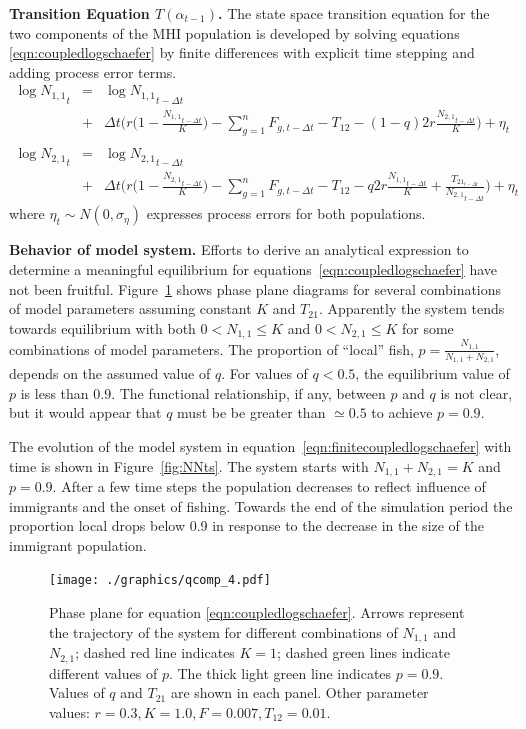 \documentclass[12pt,letterpaper,twoside]{article}
\newcommand\None{{N_{1,1}}}
\newcommand\Ntwo{{N_{2,1}}}
\newcommand\Nsum{{N_{1,1}+N_{2,1}}}
\begin{document}
{\bf Transition Equation $T(\alpha_{t-1})$.}
The state space transition equation for the two components of the MHI
population is developed by solving
equations \ref{eqn:coupledlogschaefer} by finite differences
with explicit time stepping and adding process error
terms.
\begin{eqnarray}
\label{eqn:finitecoupledlogschaefer}
\log \None_t &=& \log \None_{t-\Delta t}\nonumber\\ 
             &+&\Delta t\bigg(r\Big(1-\frac{\None_{t-\Delta t}}{K}\Big)
-\sum_{g=1}^n F_{g,t-\Delta t} - T_{12} - (1-q)2r\frac{\Ntwo_{t-\Delta
t}}{K}\bigg)+\eta_t\nonumber\\
\\ \log \Ntwo_t &=& \log \Ntwo_{t-\Delta t}\nonumber\\
             &+&\Delta t\bigg(r\Big(1-\frac{\Ntwo_{t-\Delta t}}{K}\Big)
-\sum_{g=1}^n F_{g,t-\Delta t} - T_{12} - q2r\frac{\None_{t-\Delta t}}{K}
     +\frac{T_{{21}_{t-\Delta t}}}{\Ntwo_{t-\Delta t}}\bigg)+\eta_t\nonumber
\end{eqnarray}
where $\eta_t \sim N(0,\sigma_\eta)$
expresses process errors for both populations.

{\bf Behavior of model system.}
Efforts to derive an analytical expression to determine 
a meaningful equilibrium for equations~\ref{eqn:coupledlogschaefer}
have not been fruitful.
Figure~\ref{fig:NNphase} shows phase plane diagrams for several
combinations of model parameters assuming constant $K$ and
$T_{21}$. Apparently the system tends towards
equilibrium with both $0 < \None \le K$ and $0 < \Ntwo \le K$ for some
combinations of model parameters.
The proportion of ``local'' fish, $p = \frac{\None}{\Nsum}$, depends on
the assumed value of $q$. For values of $q < 0.5$, the equilibrium
value of $p$ is less than 0.9. The functional relationship, if any,
between $p$ and $q$ is not clear, but it would appear that $q$ must be
be greater than $\simeq 0.5$ to achieve $p=0.9$.

The evolution of the model system in
equation~\ref{eqn:finitecoupledlogschaefer} with time is shown in
Figure~\ref{fig:NNts}. The system starts with $\None + \Ntwo = K$ and
$p=0.9$. After a few time steps the population decreases to reflect
influence of immigrants and the onset of fishing.
Towards the end of the simulation period the proportion local drops
below 0.9 in response to the decrease in the size of the immigrant
population.

\begin{figure}
\begin{center}
\texttt{[image: ./graphics/qcomp\_4.pdf]}
\caption{\label{fig:NNphase}
Phase plane for equation \ref{eqn:coupledlogschaefer}. Arrows represent
the trajectory of the system for different combinations of $\None$ and
$\Ntwo$; dashed red  line indicates $K = 1$; dashed green lines indicate
different values of $p$. The thick light green line indicates $p=0.9$.
Values of $q$ and $T_{21}$ are shown in each panel.
Other parameter values: $r=0.3, K=1.0, F = 0.007, T_{12}=0.01$.
}
\end{center}
\end{figure}
\end{document}
